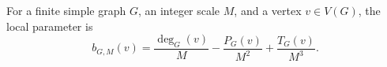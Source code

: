 \begin{definition}
For a finite simple graph $G$, an integer scale $M$, and a vertex
$v\in V(G)$, the local parameter is
\[
b_{G,M}(v)=\frac{\deg_G(v)}{M}
-\frac{P_G(v)}{M^2}
+\frac{T_G(v)}{M^3}.
\]
\end{definition}

